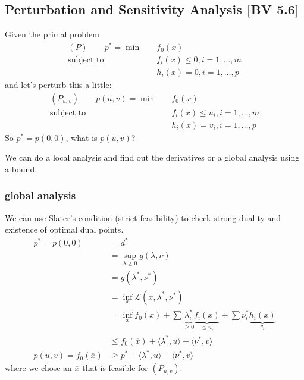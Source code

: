 \documentclass[class=article,crop=false]{standalone}
\begin{document}
\subsection{Perturbation and Sensitivity Analysis [BV 5.6]}
Given the primal problem
\begin{align*}
	(P) \qquad p^* =\min\quad &f_0(x) \\
\text{subject to } \quad &f_i(x) \leq 0, i = 1,\ldots,m \\
&h_i(x) = 0 , i = 1,\ldots,p
\end{align*}
and let's perturb this a little:
\begin{align*}
	(P_{u,v}) \qquad p(u,v)=\min\quad &f_0(x) \\
\text{subject to } \quad &f_i(x) \leq u_i, i = 1,\ldots,m \\
&h_i(x) = v_i , i = 1,\ldots,p
\end{align*}
So $ p^* =p(0,0)$, what is $ p(u,v)$?

We can do a local analysis and find out the derivatives or a global analysis using a bound.

\subsubsection{global analysis}
We can use Slater's condition (strict feasibility) to check strong duality and existence of optimal dual points.
\begin{align*}
	p^* =p(0,0)&= d^*  \\
		   &= \sup_{\lambda\geq 0} g(\lambda,\nu)\\
		   &= g(\lambda^* ,\nu^* ) \\
		   &= \inf_{x} \mathscr{L}(x,\lambda^* ,\nu^* ) \\
		   &= \inf_{x} f_0(x) + \sum \underbrace{ \lambda_i^* }_{\geq 0} \underbrace{f_i(x)}_{\leq u_i} + \sum \nu_i^* \underbrace{ h_i(x)}_{v_i} \\
		   &\leq f_0(\overline{x})+\langle \lambda^* ,u \rangle + \langle \nu^* ,v \rangle\\
	p(u,v) = f_0(\overline{x}) &\geq p^* -\langle \lambda^* ,u \rangle - \langle \nu^* ,v \rangle 
\end{align*}
where we chose an $ \overline{x}$ that is feasible for  $ (P_{u,v})$.
\end{document}
